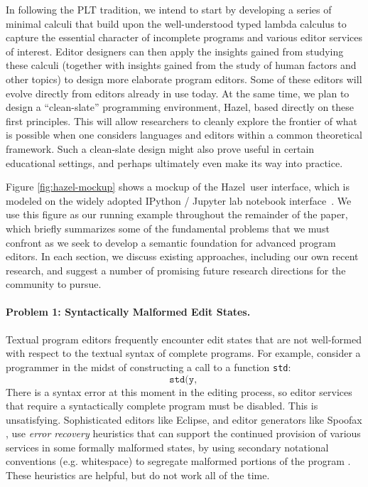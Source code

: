 \documentclass[letterpaper,USenglish]{lipics-v2016}
\newcommand{\Hazel}[0]{\textsf{Hazel}}
\begin{document}
In following the PLT tradition, we intend to start by developing a series of minimal calculi that build upon the well-understood typed lambda calculus to capture the essential character of incomplete programs and various editor services of interest. Editor designers can then apply the insights gained from studying these calculi (together with insights gained from the study of human factors and other topics) to design more elaborate program editors. Some of these editors will evolve directly from editors already in use today. At the same time, we plan to design a ``clean-slate'' programming environment, \Hazel, based directly on these first principles. This will allow researchers to cleanly explore the frontier of what is possible when one considers languages and editors within a common theoretical framework. Such a clean-slate design might also prove useful in certain educational settings, and perhaps ultimately even make its way into practice.

Figure \ref{fig:hazel-mockup} shows a mockup of the \Hazel ~user interface, which is modeled on the widely adopted IPython / Jupyter lab notebook interface~\cite{PER-GRA:2007}. 
We use this figure as our running example 
throughout the remainder of the paper, which briefly summarizes some of the fundamental problems that we must confront as we seek to develop a semantic foundation for advanced program editors. In each section, we discuss existing approaches, including our own recent research, and suggest a number of promising future research directions for the community to pursue.

\paragraph{Problem 1: Syntactically Malformed Edit States.} 
Textual program editors frequently encounter edit states
that are not well-formed with respect to the textual syntax of complete
programs. For example, consider a programmer in the midst of
constructing a call to a function \lstinline{std}: 
\[
\texttt{std(y, }
\]
There is a syntax
error at this moment in the editing process, so editor services that require a syntactically
complete program must be disabled. This is unsatisfying. Sophisticated editors like Eclipse, and editor generators like Spoofax \cite{DBLP:conf/oopsla/KatsV10}, use \emph{error recovery} heuristics that can support the continued provision 
of various services in some formally malformed states, by using secondary notational conventions (e.g. whitespace) to segregate malformed portions of the program  \cite{DBLP:conf/oopsla/KatsJNV09,DBLP:conf/sle/JongeNKV09}. These heuristics are helpful, but do not work all of the time.
\end{document}
